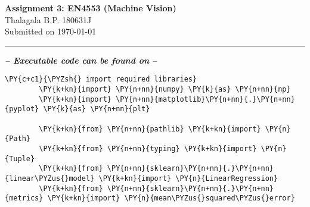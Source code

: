 \documentclass[a4paper,11pt]{article}%
\begin{document}
	\begin{center}
		{\large \textbf{Assignment 3: EN4553 (Machine Vision)}}\\
		Thalagala B.P.\hspace{0.5cm} 180631J\\
		Submitted on \today
		
	\end{center}
	\hrule


\begin{center}
	\textit{ \textbf{-- Executable code can be found on}} \href{https://github.com/bimalka98/Machine-Vision}{\faGithub} \textbf{\textit{--}}
\end{center}


\begin{tcolorbox}[breakable, size=fbox, boxrule=1pt, pad at break*=1mm,colback=cellbackground, colframe=cellborder]
	\begin{Verbatim}[commandchars=\\\{\}]
		\PY{c+c1}{\PYZsh{} import required libraries}
		\PY{k+kn}{import} \PY{n+nn}{numpy} \PY{k}{as} \PY{n+nn}{np}
		\PY{k+kn}{import} \PY{n+nn}{matplotlib}\PY{n+nn}{.}\PY{n+nn}{pyplot} \PY{k}{as} \PY{n+nn}{plt}
		
		\PY{k+kn}{from} \PY{n+nn}{pathlib} \PY{k+kn}{import} \PY{n}{Path}
		\PY{k+kn}{from} \PY{n+nn}{typing} \PY{k+kn}{import} \PY{n}{Tuple}
		\PY{k+kn}{from} \PY{n+nn}{sklearn}\PY{n+nn}{.}\PY{n+nn}{linear\PYZus{}model} \PY{k+kn}{import} \PY{n}{LinearRegression}
		\PY{k+kn}{from} \PY{n+nn}{sklearn}\PY{n+nn}{.}\PY{n+nn}{metrics} \PY{k+kn}{import} \PY{n}{mean\PYZus{}squared\PYZus{}error}
	\end{Verbatim}
\end{tcolorbox}
\end{document}
